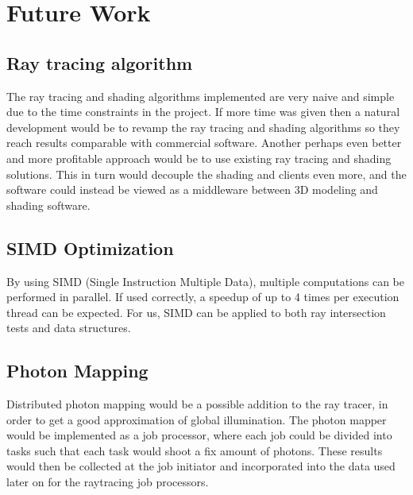 



\chapter{Future Work}
\section{Ray tracing algorithm}
The ray tracing and shading algorithms implemented are very naive and simple
due to the time constraints in the project. If more time was given then a
natural development would be to revamp the ray tracing and shading algorithms
so they reach results comparable with commercial software. Another perhaps
even better and more profitable approach would be to use existing ray
tracing and shading solutions. This in turn would decouple the shading and
clients even more, and the software could instead be viewed as a middleware
between 3D modeling and shading software.

\section{SIMD Optimization}
By using SIMD (Single Instruction Multiple Data), multiple computations
can be performed in parallel. If used correctly, a speedup of up to 4 times
per execution thread can be expected. For us, SIMD can be applied to both
ray intersection tests and data structures.


\section{Photon Mapping}
Distributed photon mapping would be a possible addition to the ray tracer,
in order to get a good approximation of global illumination. The photon
mapper would be implemented as a job processor, where each job could be
divided into tasks such that each task would shoot a fix amount of photons.
These results would then be collected at the job initiator and incorporated
into the data used later on for the raytracing job processors. 

